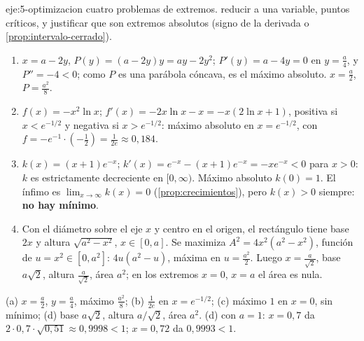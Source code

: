 \begin{solucion}{eje:5-optimizacion}
\datos cuatro problemas de extremos.
\planteamiento reducir a una variable, puntos críticos, y justificar que son extremos absolutos (signo de la derivada o \cref{prop:intervalo-cerrado}).
\pasos
\begin{enumerate}[label=(\alph*)]
  \item $x=a-2y$, $P(y)=(a-2y)y=ay-2y^{2}$; $P'(y)=a-4y=0$ en $y=\frac a4$, y $P''=-4<0$; como $P$ es una parábola cóncava, es el máximo absoluto. $x=\frac a2$, $P=\frac{a^{2}}{8}$.
  \item $f(x)=-x^{2}\ln x$; $f'(x)=-2x\ln x-x=-x(2\ln x+1)$, positiva si $x<e^{-1/2}$ y negativa si $x>e^{-1/2}$: máximo absoluto en $x=e^{-1/2}$, con $f=-e^{-1}\cdot(-\frac12)=\frac{1}{2e}\approx0{,}184$.
  \item $k(x)=(x+1)e^{-x}$; $k'(x)=e^{-x}-(x+1)e^{-x}=-xe^{-x}<0$ para $x>0$: $k$ es estrictamente decreciente en $[0,\infty)$. Máximo absoluto $k(0)=1$. El ínfimo es $\lim_{x\to\infty}k(x)=0$ (\cref{prop:crecimientos}), pero $k(x)>0$ siempre: \textbf{no hay mínimo}.
  \item Con el diámetro sobre el eje $x$ y centro en el origen, el rectángulo tiene base $2x$ y altura $\sqrt{a^{2}-x^{2}}$, $x\in[0,a]$. Se maximiza $A^{2}=4x^{2}(a^{2}-x^{2})$, función de $u=x^{2}\in[0,a^{2}]$: $4u(a^{2}-u)$, máxima en $u=\frac{a^{2}}{2}$. Luego $x=\frac{a}{\sqrt2}$, base $a\sqrt2$, altura $\frac{a}{\sqrt2}$, área $a^{2}$; en los extremos $x=0$, $x=a$ el área es nula.
\end{enumerate}
\resultado (a) $x=\frac a2$, $y=\frac a4$, máximo $\frac{a^{2}}{8}$; (b) $\frac{1}{2e}$ en $x=e^{-1/2}$; (c) máximo $1$ en $x=0$, sin mínimo; (d) base $a\sqrt2$, altura $a/\sqrt2$, área $a^{2}$.
\comprobacion (d) con $a=1$: $x=0{,}7$ da $2\cdot0{,}7\cdot\sqrt{0{,}51}\approx0{,}9998<1$; $x=0{,}72$ da $0{,}9993<1$.
\end{solucion}

